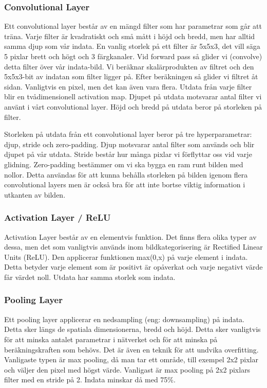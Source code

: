 \documentclass[]{kththesis}
\begin{document}
\subsubsection{Convolutional Layer}
Ett convolutional layer består av en mängd filter som har parametrar som går att träna. Varje filter är kvadratiskt och små mått i höjd och bredd, men har alltid samma djup som vår indata. En vanlig storlek på ett filter är 5x5x3, det vill säga 5 pixlar brett och högt och 3 färgkanaler. Vid forward pass så glider vi (convolve) detta filter över vår indata-bild. Vi beräknar skalärprodukten av filtret och den 5x5x3-bit av indatan som filter ligger på. Efter beräkningen så glider vi filtret åt sidan. Vanligtvis en pixel, men det kan även vara flera. Utdata från varje filter blir en tvådimensionell activation map. Djupet på utdata motsvarar antal filter vi använt i vårt convolutional layer. Höjd och bredd på utdata beror på storleken på filter.

Storleken på utdata från ett convolutional layer beror på tre hyperparametrar: djup, stride och zero-padding. Djup motsvarar antal filter som används och blir djupet på vår utdata. Stride består hur många pixlar vi förflyttar oss vid varje glidning. Zero-padding bestämmer om vi ska bygga en ram runt bilden med nollor. Detta användas för att kunna behålla storleken på bilden igenom flera convolutional layers men är också bra för att inte bortse viktig information i utkanten av bilden.

\subsubsection{Activation Layer / ReLU}
Activation Layer består av en elementvis funktion. Det finns flera olika typer av dessa, men det som vanligtvis används inom bildkategorisering är Rectified Linear Units (ReLU). Den applicerar funktionen max(0,x) på varje element i indata. Detta betyder varje element som är positivt är opåverkat och varje negativt värde får värdet noll. Utdata har samma storlek som indata.

\subsubsection{Pooling Layer}
Ett pooling layer applicerar en nedsampling (eng: downsampling) på indata. Detta sker längs de spatiala dimensionerna, bredd och höjd. Detta sker vanligtvis för att minska antalet parametrar i nätverket och för att minska på beräkningskraften som behövs. Det är även en teknik för att undvika overfitting. Vanligaste typen är max pooling, då man tar ett område, till exempel 2x2 pixlar och väljer den pixel med högst värde. Vanligast är max pooling på 2x2 pixlars filter med en stride på 2. Indata minskar då med 75\%.
\end{document}
